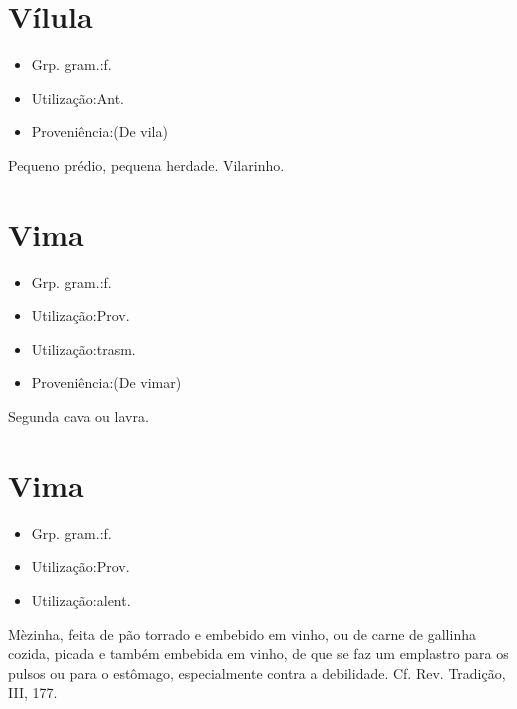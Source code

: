 \documentclass{article}
\begin{document}
\section{Vílula}
\begin{itemize}
\item {Grp. gram.:f.}
\end{itemize}
\begin{itemize}
\item {Utilização:Ant.}
\end{itemize}
\begin{itemize}
\item {Proveniência:(De \textunderscore vila\textunderscore )}
\end{itemize}
Pequeno prédio, pequena herdade.
Vilarinho.
\section{Vima}
\begin{itemize}
\item {Grp. gram.:f.}
\end{itemize}
\begin{itemize}
\item {Utilização:Prov.}
\end{itemize}
\begin{itemize}
\item {Utilização:trasm.}
\end{itemize}
\begin{itemize}
\item {Proveniência:(De \textunderscore vimar\textunderscore )}
\end{itemize}
Segunda cava ou lavra.
\section{Vima}
\begin{itemize}
\item {Grp. gram.:f.}
\end{itemize}
\begin{itemize}
\item {Utilização:Prov.}
\end{itemize}
\begin{itemize}
\item {Utilização:alent.}
\end{itemize}
Mèzinha, feita de pão torrado e embebido em vinho, ou de carne de gallinha cozida, picada e também embebida em vinho, de que se faz um emplastro para os pulsos ou para o estômago, especialmente contra a debilidade. Cf. Rev. \textunderscore Tradição\textunderscore , III, 177.
\end{document}
